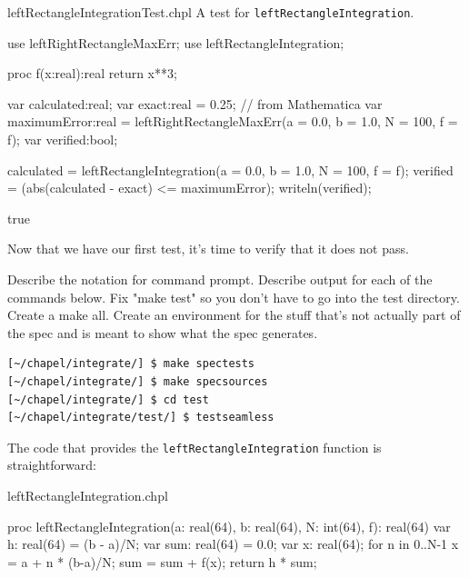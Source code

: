 \begin{chapelexample}{leftRectangleIntegrationTest.chpl}
A test for \lstinline{leftRectangleIntegration}.
\begin{chapelpre}
use leftRightRectangleMaxErr;
use leftRectangleIntegration;
\end{chapelpre}
\begin{chapel}
proc f(x:real):real {
  return x**3;
} 
  
var calculated:real;
var exact:real = 0.25;  // from Mathematica
var maximumError:real = leftRightRectangleMaxErr(a = 0.0, b = 1.0, N = 100, f = f);
var verified:bool;

calculated = leftRectangleIntegration(a = 0.0, b = 1.0, N = 100, f = f);
verified = (abs(calculated - exact) <= maximumError);
writeln(verified);
\end{chapel}
\begin{chapelpost}
\end{chapelpost}
\begin{chapeloutput}
true
\end{chapeloutput}
\end{chapelexample}

Now that we have our first test, it's time to verify that it does not pass.
\begin{TODO}
Describe the notation for command prompt. Describe output for each of the commands below. 
Fix "make test" so you don't have to go into the test directory. Create a make all. Create
an environment for the stuff that's not actually part of the spec and is meant to show what
the spec generates.
\end{TODO}
\begin{verbatim}
[~/chapel/integrate/] $ make spectests
[~/chapel/integrate/] $ make specsources
[~/chapel/integrate/] $ cd test
[~/chapel/integrate/test/] $ testseamless
\end{verbatim}

The code that provides the \lstinline{leftRectangleIntegration} function is straightforward:
\begin{chapelsource}{leftRectangleIntegration.chpl}
\begin{chapel}
proc leftRectangleIntegration(a: real(64), b: real(64), N: int(64), f): real(64){
  var h: real(64) = (b - a)/N;
  var sum: real(64) = 0.0;
  var x: real(64);
  for n in 0..N-1 {
    x = a + n * (b-a)/N;
    sum = sum + f(x);
  }
  return h * sum;
}
\end{chapel}
\end{chapelsource}

